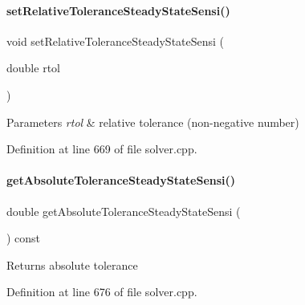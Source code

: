 \paragraph{\texorpdfstring{setRelativeToleranceSteadyStateSensi()}{setRelativeToleranceSteadyStateSensi()}}
{\footnotesize\ttfamily void set\+Relative\+Tolerance\+Steady\+State\+Sensi (\begin{DoxyParamCaption}\item[{double}]{rtol }\end{DoxyParamCaption})}


\begin{DoxyParams}{Parameters}
{\em rtol} & relative tolerance (non-\/negative number) \\
\hline
\end{DoxyParams}


Definition at line 669 of file solver.\+cpp.

\mbox{\label{classamici_1_1_solver_ae1b148791e34ba2220eba9c75d21afb0}} 
\paragraph{\texorpdfstring{getAbsoluteToleranceSteadyStateSensi()}{getAbsoluteToleranceSteadyStateSensi()}}
{\footnotesize\ttfamily double get\+Absolute\+Tolerance\+Steady\+State\+Sensi (\begin{DoxyParamCaption}{ }\end{DoxyParamCaption}) const}

\begin{DoxyReturn}{Returns}
absolute tolerance 
\end{DoxyReturn}


Definition at line 676 of file solver.\+cpp.

